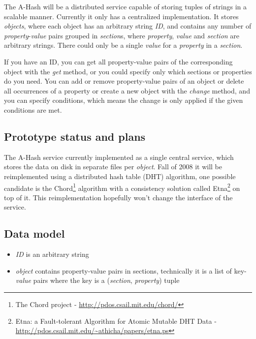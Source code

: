 \documentclass{book}
\begin{document}
The A-Hash will be a distributed service capable of storing tuples of strings in a scalable manner. Currently it only has a centralized implementation. It stores \emph{objects}, where each object has an arbitrary string \emph{ID}, and contains any number of \emph{property}-\emph{value} pairs grouped in \emph{section}s, where \emph{property}, \emph{value} and \emph{section} are arbitrary strings. There could only be a single \emph{value} for a \emph{property} in a \emph{section}.

If you have an ID, you can get all property-value pairs of the corresponding object with the \emph{get} method, or you could specify only which sections or properties do you need. You can add or remove property-value pairs of an object or delete all occurrences of a property or create a new object with the \emph{change} method, and you can specify conditions, which means the change is only applied if the given conditions are met.


\subsection{Prototype status and plans} %

The A-Hash service currently implemented as a single central service, which stores the data on disk in separate files per \emph{object}. Fall of 2008 it will be reimplemented using a distributed hash table (DHT) algorithm, one possible candidate is the Chord\footnote{The Chord project - \url{http://pdos.csail.mit.edu/chord/}} algorithm with a consistency solution called Etna\footnote{Etna: a Fault-tolerant Algorithm for Atomic Mutable DHT Data - \url{http://pdos.csail.mit.edu/\~athicha/papers/etna.ps}} on top of it. This reimplementation hopefully won’t change the interface of the service.


\subsection{Data model} %

\begin{itemize}
    \item \emph{ID} is an arbitrary string
    \item \emph{object} contains property-value pairs in sections, technically it is a list of key-\emph{value} pairs where the key is a (\emph{section}, \emph{property}) tuple
\end{itemize}
\end{document}
